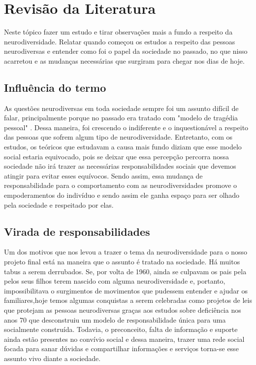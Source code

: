 \chapter{Revisão da Literatura}


Neste tópico fazer um estudo e tirar observações mais a fundo a respeito da neurodiversidade. Relatar quando começou os estudos a respeito das pessoas neurodiversas e entender como foi o papel da sociedade no passado, no que nisso acarretou e as mudanças necessárias que surgiram para chegar nos dias de hoje. 
\section{Influência do termo}
As questões neurodiversas em toda sociedade sempre foi um assunto difícil de falar, principalmente porque no passado era tratado com "modelo de tragédia pessoal" \cite{oliver1990politics}. Dessa maneira, foi crescendo o indiferente e o inquestionável a  respeito das pessoas que sofrem algum tipo de neurodiversidade. Entretanto, com os estudos, os teóricos que estudavam a causa mais fundo diziam que esse modelo social estaria equivocado, pois se deixar que essa percepção percorra nossa sociedade não irá trazer as necessárias responsabilidades sociais que devemos atingir para evitar esses equívocos. 
Sendo assim, essa mudança de responsabilidade para o comportamento com as neurodiversidades promove o empoderamentos do indivíduo e sendo assim ele ganha espaço para ser olhado pela sociedade e respeitado por elas. 

\section{Virada de responsabilidades}
Um dos motivos que nos levou a trazer o tema da neurodiversidade para o nosso projeto final está na maneira que o assunto é tratado na sociedade. Há muitos tabus a serem derrubados. Se, por volta de 1960, ainda se culpavam os pais pela pelos seus filhos terem nascido com alguma neurodiversidade e, portanto, impossibilitava o surgimentos de movimentos que pudessem entender e ajudar os familiares,hoje temos algumas conquistas a serem celebradas como projetos de leis que protejam as pessoas neurodiversas graças aos estudos sobre deficiência nos anos 70 que desconstruiu um modelo de responsabilidade única para uma socialmente construída.\cite{ortega}
Todavia, o preconceito, falta de informação e suporte ainda estão presentes no convívio social e dessa maneira, trazer uma rede social focada para sanar dúvidas e compartilhar informações e serviços torna-se esse assunto vivo diante a sociedade.  

